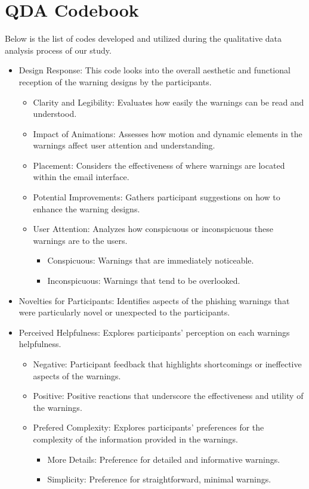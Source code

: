 \documentclass[
  a4paper,  %
  twoside,  %
  bibliography=totoc,
  headsepline,
  cleardoublepage=empty,
  parskip=half,
  draft=false
]{scrbook}
\begin{document}
\section{QDA Codebook}
\label{sec:qda}
Below is the list of codes developed and utilized during the qualitative data analysis process of our study.
\begin{itemize}
    \item Design Response: This code looks into the overall aesthetic and functional reception of the warning designs by the participants.
    \begin{itemize}
        \item Clarity and Legibility: Evaluates how easily the warnings can be read and understood.
        \item Impact of Animations: Assesses how motion and dynamic elements in the warnings affect user attention and understanding.
        \item Placement: Considers the effectiveness of where warnings are located within the email interface.
        \item Potential Improvements: Gathers participant suggestions on how to enhance the warning designs.
        \item User Attention: Analyzes how conspicuous or inconspicuous these warnings are to the users.
        \begin{itemize}
            \item Conspicuous: Warnings that are immediately noticeable.
            \item  Inconspicuous: Warnings that tend to be overlooked.
        \end{itemize}
    \end{itemize}
    \item Novelties for Participants: Identifies aspects of the phishing warnings that were particularly novel or unexpected to the participants.
    \item Perceived Helpfulness: Explores participants' perception on each warnings helpfulness.
    \begin{itemize}
        \item Negative: Participant feedback that highlights shortcomings or ineffective aspects of the warnings.
        \item Positive: Positive reactions that underscore the effectiveness and utility of the warnings.
        \item Prefered Complexity: Explores participants' preferences for the complexity of the information provided in the warnings.
        \begin{itemize}
            \item More Details: Preference for detailed and informative warnings.
            \item Simplicity: Preference for straightforward, minimal warnings.
        \end{itemize}
    \end{itemize}
\end{itemize}

%

\pagestyle{empty}
\renewcommand*{\chapterpagestyle}{empty}
\Affirmation
\end{document}
